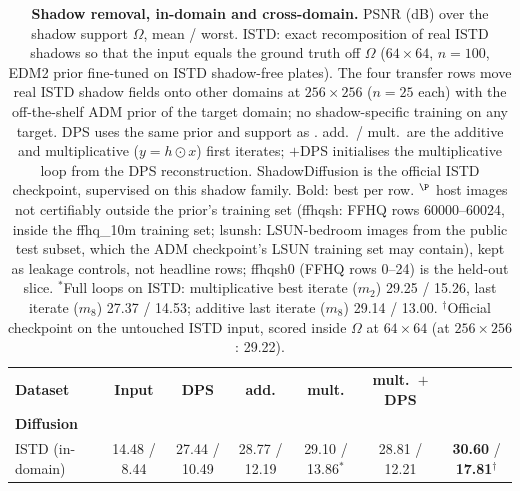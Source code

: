 \begin{table}[t]
    \centering
    \caption{
    \textbf{Shadow removal, in-domain and cross-domain.}
    PSNR (dB) over the shadow support $\Omega$, mean / worst. ISTD: exact recomposition of real ISTD shadows so that the input equals the ground truth off $\Omega$ ($64\times64$, $n{=}100$, EDM2 prior fine-tuned on ISTD shadow-free plates). The four transfer rows move real ISTD shadow fields onto other domains at $256\times256$ ($n{=}25$ each) with the off-the-shelf ADM prior of the target domain; no shadow-specific training on any target. DPS uses the same prior and support as \method. \methodmin{} add.\ / mult.\ are the additive and multiplicative ($y = h\odot x$) first iterates; $+$DPS initialises the multiplicative loop from the DPS reconstruction. ShadowDiffusion is the official ISTD checkpoint, supervised on this shadow family. Bold: best per row. $^\P$ host images not certifiably outside the prior's training set (ffhqsh: FFHQ rows 60000--60024, inside the ffhq\_10m training set; lsunsh: LSUN-bedroom images from the public test subset, which the ADM checkpoint's LSUN training set may contain), kept as leakage controls, not headline rows; ffhqsh0 (FFHQ rows 0--24) is the held-out slice.
    $^\ast$Full loops on ISTD: multiplicative best iterate ($m_2$) 29.25 / 15.26, last iterate ($m_8$) 27.37 / 14.53; additive last iterate ($m_8$) 29.14 / 13.00.
    $^\dagger$Official checkpoint on the untouched ISTD input, scored inside $\Omega$ at $64\times64$ (at $256\times256$: 29.22).
    }
    \label{tab:shadow_unified}
    \small
    \setlength{\tabcolsep}{3.2pt}
    \renewcommand{\arraystretch}{1.08}
    \begin{tabular}{@{}lcccccc@{}}
        \toprule
        \textbf{Dataset}
        & \textbf{Input}
        & \textbf{DPS}
        & \textbf{\methodmin{} add.}
        & \textbf{\methodmin{} mult.}
        & \textbf{\methodmin{} mult.\ $+$DPS}
        & \shortstack{\textbf{Shadow}\\\textbf{Diffusion}} \\
        \midrule
        ISTD (in-domain) & 14.48 / 8.44 & 27.44 / 10.49 & 28.77 / 12.19 & 29.10 / 13.86$^\ast$ & 28.81 / 12.21 & \textbf{30.60} / \textbf{17.81}$^\dagger$ \\

\end{tabular}
\end{table}

